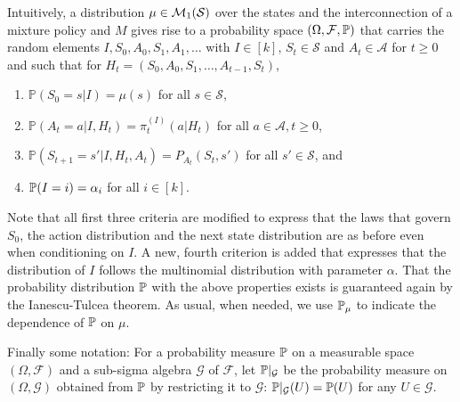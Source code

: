 \documentclass{article}
\DeclareMathOperator*{\1}{\mathbbm{1}}
\newcommand{\cF}{\mathcal{F}}
\newcommand{\0}{\mathbf{0}}
\theoremstyle{definition}
\theoremstyle{remark}
\theoremstyle{theorem}
\newcommand{\cS}{\mathcal{S}}
\newcommand{\cA}{\mathcal{A}}
\begin{document}
Intuitively,
a distribution $\mu\in \cM_1(\cS)$ over the states and
the interconnection of a mixture policy and $M$ gives rise to a probability space $(\Omega,\cF,\PP)$ that carries the random elements
$I,S_0,A_0,S_1,A_1,\dots$ with $I\in [k]$, $S_t\in \cS$ and $A_t\in \cA$ for $t\ge 0$ and such that
for $H_t = (S_0,A_0,S_1,\dots,A_{t-1},S_t)$,
\begin{enumerate}
\item  $\mathbb{P}(S_0 = s|I) = \mu(s)$ for all $s \in \mathcal{S}$,
\item  $\mathbb{P}(A_t = a | I,H_t)
			= \pi^{(I)}_t(a | H_t)$ for all $a \in \mathcal{A}, t \geq 0$,
\item  $\mathbb{P}(S_{t+1} = s' | I, H_t, A_t) = P_{A_t}(S_t, s')$ for all $s' \in \mathcal{S}$, and
\item $\mathbb{P}(I=i)=\alpha_i$ for all $i\in [k]$.
\end{enumerate}
Note that all first three criteria are modified to express that the laws that govern $S_0$, the action distribution and the next state distribution are as before even when conditioning on $I$.
A new, fourth criterion is added that expresses that
the distribution of $I$ follows the multinomial distribution with parameter $\alpha$.
That the probability distribution $\mathbb{P}$ with the above properties
exists is guaranteed again by the Ianescu-Tulcea theorem.
As usual, when needed, we use $\mathbb{P}_\mu$ to indicate the dependence of $\mathbb{P}$ on $\mu$.

\newcommand{\N}{\mathbb{N}}
\newcommand{\cG}{\mathcal{G}}

Finally some notation:
For a probability measure $\mathbb{P}$ on a measurable space $(\Omega,\cF)$ and a sub-sigma algebra $\cG$ of $\cF$, let $\PP|_{\cG}$ be the probability measure on $(\Omega,\cG)$ obtained from $\mathbb{P}$ by restricting it to $\cG$: $\PP|_{\cG}(U) = \PP(U)$ for any $U\in \cG$.
\end{document}
